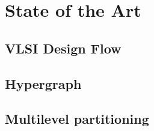 \documentclass[12pt,a4paper]{article}
\begin{document}
\section{State of the Art}

\subsection{VLSI Design Flow}

\subsection{Hypergraph}

\subsection{Multilevel partitioning}
\end{document}
